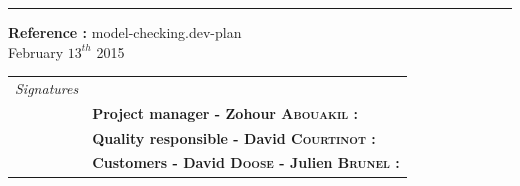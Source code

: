 \documentclass{report}
\begin{document}
\begin{titlepage}


\vspace*{4.5cm}

\noindent
\begin{minipage}{0.35\linewidth}
    \begin{flushright}
        \printauthor
    \end{flushright}
\end{minipage} \hspace{15pt}
%
\begin{minipage}{0.02\linewidth}
    \rule{1pt}{175pt}
\end{minipage} \hspace{-10pt}
%
\begin{minipage}{0.6\linewidth}
\vspace{5pt}
\newenvironment{test}{\begin{center}}{\end{center}}
\hspace{10pt}
\begin{minipage}{\linewidth} 
\textbf{Reference :} model-checking.dev-plan ~\\
February $13^{th}$ 2015
\end{minipage}
\end{minipage}

\vspace{8cm}
\begin{minipage}{0.20\linewidth}
    \begin{flushright}
       
        \begin{tabular}{ll}
	 \textit{Signatures} & \\
			& \textbf{Project manager - Zohour \textsc{Abouakil} :} \\
            & \textbf{Quality responsible - David \textsc{Courtinot} :} \\
            & \textbf{Customers - David \textsc{Doose} - Julien \textsc{Brunel} :} \\
        \end{tabular}
    \end{flushright}
\end{minipage}

\end{titlepage}
\restoregeometry
\tableofcontents
{}
\end{document}
